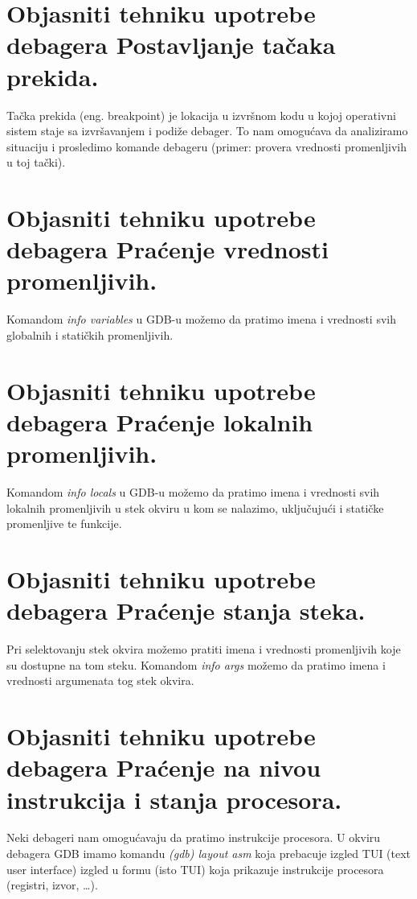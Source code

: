 \documentclass[a4paper]{article}
\begin{document}
\section{Objasniti tehniku upotrebe debagera Postavljanje tačaka prekida.}
  Tačka prekida (eng. breakpoint) je lokacija u izvršnom kodu u kojoj operativni sistem staje 
  sa izvršavanjem i podiže debager. To nam omogućava da analiziramo situaciju i 
  prosledimo komande debageru (primer: provera vrednosti promenljivih u toj tački).

\section{Objasniti tehniku upotrebe debagera Praćenje vrednosti promenljivih.}
  Komandom \textit{info variables} u GDB-u možemo da pratimo imena i vrednosti svih globalnih i 
  statičkih promenljivih.

\section{Objasniti tehniku upotrebe debagera Praćenje lokalnih promenljivih.}
  Komandom \textit{info locals} u GDB-u možemo da pratimo imena i vrednosti svih lokalnih 
  promenljivih u stek okviru u kom se nalazimo, uključujući i statičke promenljive te funkcije.

\section{Objasniti tehniku upotrebe debagera Praćenje stanja steka.}
  Pri selektovanju stek okvira možemo pratiti imena i vrednosti 
  promenljivih koje su dostupne na tom steku. Komandom \textit{info args} možemo 
  da pratimo imena i vrednosti argumenata tog stek okvira.

\section{Objasniti tehniku upotrebe debagera Praćenje na nivou instrukcija i stanja procesora.}
  Neki debageri nam omogućavaju da pratimo instrukcije procesora. U okviru debagera GDB imamo komandu 
  \textit{(gdb) layout asm} koja prebacuje izgled TUI (text user interface) izgled u formu (isto TUI)
  koja prikazuje instrukcije procesora (registri, izvor, \dots). \cite{gdb_commands}
\end{document}
